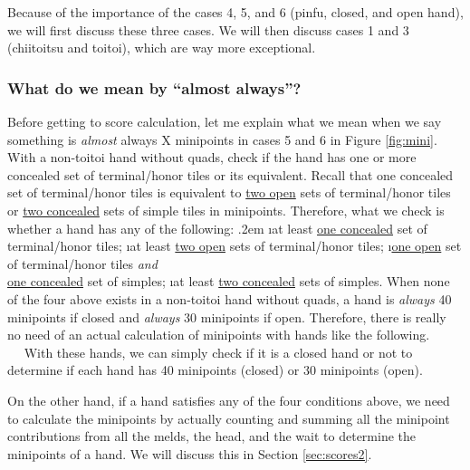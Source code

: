 \bigskip
Because of the importance of the cases 4, 5, and 6 ({\jap pinfu}, closed, and open hand), we will first discuss these three cases. We will then discuss cases 1 and 3 ({\jap chiitoitsu} and {\jap toitoi}), which are way more exceptional. 

\subsubsection{What do we mean by ``almost always''?}
Before getting to score calculation, let me explain what we mean when we say something is \emph{almost} always X minipoints in cases 5 and 6 in Figure \ref{fig:mini}. 
With a non-{\jap toitoi} hand without quads, check if the hand has one or more concealed set of terminal/honor tiles or its equivalent. Recall that one concealed set of terminal/honor tiles is equivalent to \underline{two open} sets of terminal/honor tiles or \underline{two concealed} sets of simple tiles in minipoints. 
Therefore, what we check is whether a hand has any of the following:
\bi \itemsep.2em
\i at least \underline{one concealed} set of terminal/honor tiles;
\i at least \underline{two open} sets of terminal/honor tiles;
\i \underline{one open} set of terminal/honor tiles \emph{and} \\
\underline{one concealed} set of simples;
\i at least \underline{two concealed} sets of simples.
\ei
When none of the four above exists in a non-{\jap toitoi} hand without quads, a hand is \emph{always} 40 minipoints if closed and \emph{always} 30 minipoints if open. Therefore, there is really no need of an actual calculation of minipoints with hands like the following. 
\bp
{}~\zhong\rzhong\zhong\\
~\rdong\dong\dong~
\ep
With these hands, we can simply check if it is a closed hand or not to determine if each hand has 40 minipoints (closed) or 30 minipoints (open). 

\bigskip
On the other hand, if a hand satisfies any of the four conditions above, we need to calculate the minipoints by actually counting and summing all the minipoint contributions from all the melds, the head, and the wait to determine the minipoints of a hand. We will discuss this in Section \ref{sec:scores2}.  


